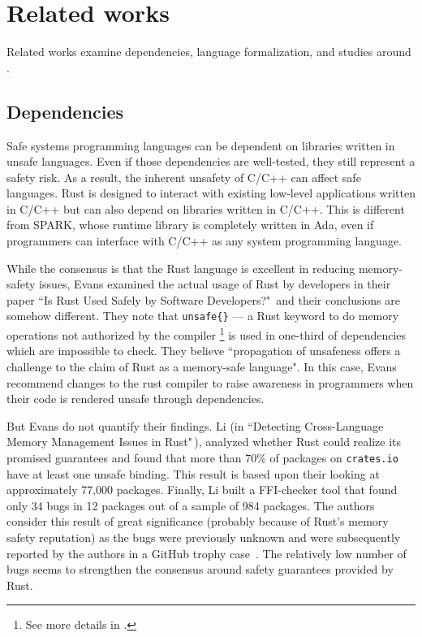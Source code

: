 \documentclass[nomenclature, english, bibtex]{kththesis}
\begin{document}
\cleardoublepage

\chapter{Related works}
\label{ch:relatedworks}

Related works examine dependencies, language formalization, and studies around .

\section{Dependencies}
\label{subsec:dependencies}

Safe systems programming languages can be dependent on libraries written in unsafe languages. Even if those dependencies are well-tested, they still represent a safety risk. As a result, the inherent unsafety of C/C++ can affect safe languages. Rust is designed to interact with existing low-level applications written in C/C++ but can also depend on libraries written in C/C++. This is different from SPARK, whose runtime library is completely written in Ada, even if programmers can interface with C/C++ as any system programming language.

While the consensus is that the Rust language is excellent in reducing memory-safety issues, Evans \etal examined the actual usage of Rust by developers in their paper ``Is Rust Used Safely by Software Developers?"\,\cite{evans_is_2020} and their conclusions are somehow different. They note that \texttt{unsafe\{\}} --- a Rust keyword to do memory operations not authorized by the compiler \footnote{See more details in .} is used in one-third of dependencies which are impossible to check. They believe ``propagation of unsafeness offers a challenge to the claim of Rust as a memory-safe language". In this case, Evans \etal recommend changes to the rust compiler to raise awareness in programmers when their code is rendered unsafe through dependencies. 

But Evans \etal do not quantify their findings. Li \etal (in ``Detecting Cross-Language Memory Management Issues in Rust"\,\cite{li_detecting_2022}), analyzed whether  Rust could realize its promised guarantees and found that more than 70\% of packages on \texttt{crates.io} have at least one unsafe binding. This result is based upon their looking at approximately 77,000 packages. Finally, Li \etal built a \gls{FFI}-checker tool that found only 34 bugs in 12 packages out of a sample of 984 packages. The authors consider this result of great significance (probably because of Rust's memory safety reputation) as the bugs were previously unknown and were subsequently reported by the authors in a GitHub trophy case \,\cite{li_rust-ffi-checkertrophy-case_nodate}. The relatively low number of bugs seems to strengthen the consensus around safety guarantees provided by Rust.
\end{document}
